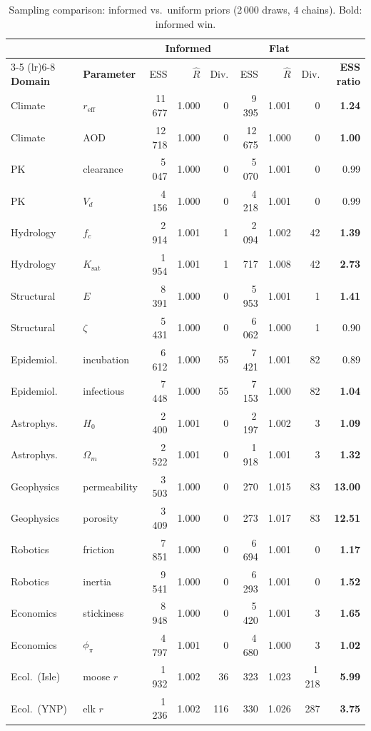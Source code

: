\documentclass[11pt,a4paper]{article}
\begin{document}
\begin{table}[!htbp]
\centering
\caption{Sampling comparison: informed vs.\ uniform priors (2\,000 draws, 4 chains). Bold: informed win.}
\label{tab:mcmc}
\scriptsize
\setlength{\tabcolsep}{3pt}
\renewcommand{\arraystretch}{0.93}
\begin{tabular*}{\linewidth}{@{\extracolsep{\fill}}llrrrrrrr@{}}
  \toprule
  & & \multicolumn{3}{c}{\textbf{Informed}} & \multicolumn{3}{c}{\textbf{Flat}} & \\
  \cmidrule(lr){3-5} \cmidrule(lr){6-8}
  \textbf{Domain} & \textbf{Parameter} & ESS & $\hat{R}$ & Div. & ESS & $\hat{R}$ & Div. & \textbf{ESS ratio} \\
  \midrule
  Climate & $r_{\text{eff}}$ & 11\,677 & 1.000 & 0 & 9\,395 & 1.001 & 0 & \textbf{1.24} \\
  Climate & AOD & 12\,718 & 1.000 & 0 & 12\,675 & 1.000 & 0 & \textbf{1.00} \\
  PK & clearance & 5\,047 & 1.000 & 0 & 5\,070 & 1.001 & 0 & 0.99 \\
  PK & $V_d$ & 4\,156 & 1.000 & 0 & 4\,218 & 1.001 & 0 & 0.99 \\
  Hydrology & $f_c$ & 2\,914 & 1.001 & 1 & 2\,094 & 1.002 & 42 & \textbf{1.39} \\
  Hydrology & $K_{\text{sat}}$ & 1\,954 & 1.001 & 1 & 717 & 1.008 & 42 & \textbf{2.73} \\
  Structural & $E$ & 8\,391 & 1.000 & 0 & 5\,953 & 1.001 & 1 & \textbf{1.41} \\
  Structural & $\zeta$ & 5\,431 & 1.000 & 0 & 6\,062 & 1.000 & 1 & 0.90 \\
  Epidemiol. & incubation & 6\,612 & 1.000 & 55 & 7\,421 & 1.001 & 82 & 0.89 \\
  Epidemiol. & infectious & 7\,448 & 1.000 & 55 & 7\,153 & 1.000 & 82 & \textbf{1.04} \\
  Astrophys. & $H_0$ & 2\,400 & 1.001 & 0 & 2\,197 & 1.002 & 3 & \textbf{1.09} \\
  Astrophys. & $\Omega_m$ & 2\,522 & 1.001 & 0 & 1\,918 & 1.001 & 3 & \textbf{1.32} \\
  Geophysics & permeability & 3\,503 & 1.000 & 0 & 270 & 1.015 & 83 & \textbf{13.00} \\
  Geophysics & porosity & 3\,409 & 1.000 & 0 & 273 & 1.017 & 83 & \textbf{12.51} \\
  Robotics & friction & 7\,851 & 1.000 & 0 & 6\,694 & 1.001 & 0 & \textbf{1.17} \\
  Robotics & inertia & 9\,541 & 1.000 & 0 & 6\,293 & 1.001 & 0 & \textbf{1.52} \\
  Economics & stickiness & 8\,948 & 1.000 & 0 & 5\,420 & 1.001 & 3 & \textbf{1.65} \\
  Economics & $\phi_\pi$ & 4\,797 & 1.001 & 0 & 4\,680 & 1.000 & 3 & \textbf{1.02} \\
  Ecol.\ (Isle) & moose $r$ & 1\,932 & 1.002 & 36 & 323 & 1.023 & 1\,218 & \textbf{5.99} \\
  Ecol.\ (YNP) & elk $r$ & 1\,236 & 1.002 & 116 & 330 & 1.026 & 287 & \textbf{3.75} \\
  \bottomrule
\end{tabular*}
\end{table}
\end{document}
